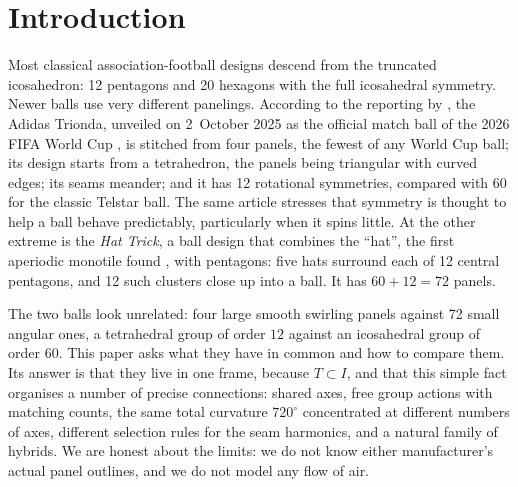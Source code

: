\documentclass[11pt]{article}
\theoremstyle{definition}
\theoremstyle{remark}
\begin{document}
\section{Introduction}
Most classical association-football designs descend from the truncated icosahedron: 12 pentagons and 20 hexagons
with the full icosahedral symmetry. Newer balls use very different panelings. According to the reporting by
\citet{hasson_sciam}, the Adidas Trionda, unveiled on 2~October 2025 as the official match ball of the 2026 FIFA World Cup
\citep{wiki_trionda}, is stitched from four panels, the fewest of any World Cup ball; its design starts from a
tetrahedron, the panels being triangular with curved edges; its seams meander; and it has 12 rotational symmetries,
compared with 60 for the classic Telstar ball. The same article stresses that symmetry is thought to help a ball
behave predictably, particularly when it spins little. At the other extreme is the \emph{Hat Trick}, a ball design that combines the
``hat'', the first aperiodic monotile found \citep{smith_hat}, with pentagons: five hats surround each of 12 central pentagons, and 12 such clusters close up into a ball. It has
$60+12=72$ panels.

The two balls look unrelated: four large smooth swirling panels against 72 small angular ones, a tetrahedral group of order $12$ against an icosahedral group of order $60$. This paper asks
what they have in common and how to compare them. Its answer is that they live in one frame, because $T\subset I$, and that this simple fact organises a number of precise connections:
shared axes, free group actions with matching counts, the same total curvature $720^\circ$ concentrated at different numbers of axes, different selection rules for the seam harmonics, and a natural
family of hybrids. We are honest about the limits: we do not know either manufacturer's actual panel outlines, and we do not model any flow of air.
\end{document}
